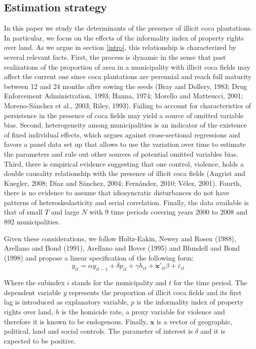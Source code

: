 \subsection{Estimation strategy}
\label{strategy}

In this paper we study the determinants of the presence of illicit coca plantations. In particular, we focus on the effects of the informality index of property rights over land. As we argue in section \ref{intro}, this relationship is characterized by several relevant facts. First, the process is dynamic in the sense that past realizations of the proportion of area in a municipality with illicit coca fields may affect the current one since coca plantations are perennial and reach full maturity between 12 and 24 months after sowing the seeds (Bray and Dollery, 1983; Drug Enforcement Administration, 1993; Hanna, 1974; Morello and Matteucci, 2001; Moreno-S\'{a}nchez et al., 2003; Riley, 1993). Failing to account for characteristics of persistence in the presence of coca fields may yield a source of omitted variable bias. Second, heterogeneity among municipalities is an indicator of the existence of fixed individual effects, which argues against cross-sectional regressions and favors a panel data set up that allows to use the variation over time to estimate the parameters and rule out other sources of potential omitted variables bias. Third, there is empirical evidence suggesting that one control, violence, holds a double causality relationship with the presence of illicit coca fields (Angrist and Kuegler, 2008; D\'{i}az and S\'{a}nchez, 2004; Fern\'{a}ndez, 2010; V\'{e}lez, 2001). Fourth, there is no evidence to assume that idiosyncratic disturbances do not have patterns of heteroskedasticity and serial correlation. Finally, the data available is that of small $T$ and large $N$ with 9 time periods covering years 2000 to 2008 and 892 municipalities.

Given these considerations, we follow Holtz-Eakin, Newey and Rosen (1988), Arellano and Bond (1991), Arellano and Bover (1995) and Blundell and Bond (1998) and propose a linear specification of the following form:
\begin{equation}
\label{model}
y_{it}=\alpha y_{it-1}+\delta p_{it} + \gamma h_{it} + \mathbf{x'}_{it}\beta + \varepsilon_{it}
\end{equation}

Where the subindex $i$ stands for the municipality and $t$ for the time period. The dependent variable $y$ represents the proportion of illicit coca fields and its first lag is introduced as explanatory variable, $p$ is the informality index of property rights over land, $h$ is the homicide rate, a proxy variable for violence and therefore it is known to be endogenous. Finally, $\mathbf{x}$ is a vector of geographic, political, land and social controls. The parameter of interest is $\delta$ and it is expected to be positive.

